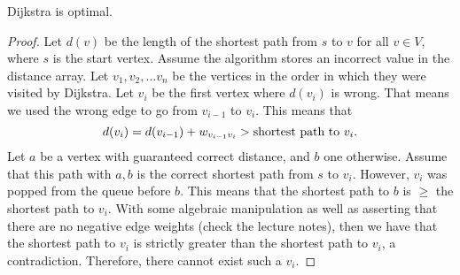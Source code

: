 \begin{theorem}
	Dijkstra is optimal.
\end{theorem}
\begin{proof}
	Let \( d(v) \) be the length of the shortest path from \( s \) to \( v  \) for all \( v \in V\), where \( s \) is the start vertex. Assume the algorithm stores an incorrect value in the distance array. Let \( v_{1}, v_{2}, \ldots v_n \) be the vertices in the order in which they were visited by Dijkstra. Let \( v_i \) be the first vertex where \( d(v_i) \) is wrong. That means we used the wrong edge to go from \( v_{i-1} \) to \( v_i \). This means that \[
		d(v_i) = d(v_{i-1}) + w_{v_{i-1}v_i} > \text{shortest path to \( v_i \)}
	.\] Let \( a \) be a vertex with guaranteed correct distance, and \( b \) one otherwise. Assume that this path with \( a,b \) is the correct shortest path from \( s \) to \( v_i \). However, \( v_i \) was popped from the queue before \( b \). This means that the shortest path to \( b \) is \( \ge  \) the shortest path to \( v_i \). With some algebraic manipulation as well as asserting that there are no negative edge weights (check the lecture notes), then we have that the shortest path to \( v_i \) is strictly greater than the shortest path to \( v_i \), a contradiction. Therefore, there cannot exist such a \( v_i \).
\end{proof}
